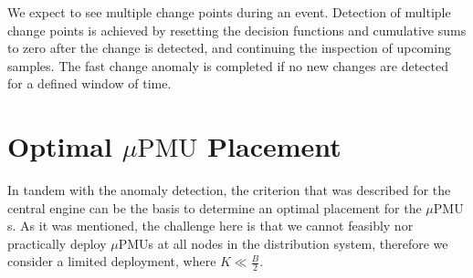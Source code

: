\documentclass[twocolumn]{IEEEtran}
\newcommand{\mup}{\mu \text{PMU}}
\begin{document}
We expect to see multiple change points during an event. Detection of multiple change points is achieved by resetting the decision functions and cumulative sums to zero after the change is detected, and continuing the inspection of upcoming samples. The fast change anomaly is completed if no new changes are detected for a defined window of time.
\section{Optimal $\mup$ Placement}
In tandem with the anomaly detection, the criterion that was described for the central engine can be the basis to determine an optimal placement for the $\mup$s. As it was mentioned, the challenge here is that we cannot feasibly nor practically deploy $\mup$s at all nodes in the distribution system, therefore we consider a limited deployment, where $K \ll \frac{B}{2}$.  
\end{document}
